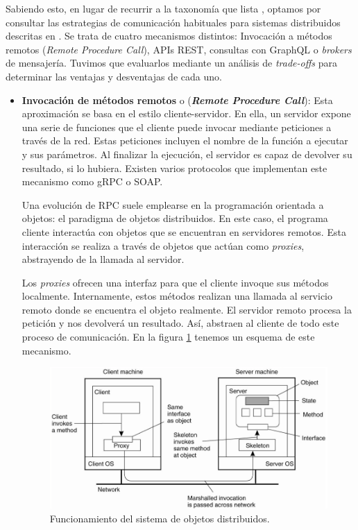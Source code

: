 Sabiendo esto, en lugar de recurrir a la taxonomía que lista \cite{mehtaTaxonomySoftwareConnectors2000}, optamos por consultar las estrategias de comunicación habituales para sistemas distribuidos descritas en \cite{newmanBuildingMicroservicesDesigning2021}. Se trata de cuatro mecanismos distintos: Invocación a métodos remotos (\emph{Remote Procedure Call}), APIs REST, consultas con GraphQL o \emph{brokers} de mensajería. Tuvimos que evaluarlos mediante un análisis de \emph{trade-offs} para determinar las ventajas y desventajas de cada uno.

\begin{itemize}
  \item \textbf{Invocación de métodos remotos} o (\emph{\textbf{Remote Procedure Call}}): Esta aproximación se basa en el estilo cliente-servidor. En ella, un servidor expone una serie de funciones que el cliente puede invocar mediante peticiones a través de la red. Estas peticiones incluyen el nombre de la función a ejecutar y sus parámetros. Al finalizar la ejecución, el servidor es capaz de devolver su resultado, si lo hubiera. Existen varios protocolos que implementan este mecanismo como gRPC o SOAP.

  Una evolución de RPC suele emplearse en la programación orientada a objetos: el paradigma de objetos distribuidos. \cite{tanenbaumChapter10Distributed2007} En este caso, el programa cliente interactúa con objetos que se encuentran en servidores remotos. Esta interacción se realiza a través de objetos que actúan como \emph{proxies}, abstrayendo de la llamada al servidor.

  Los \emph{proxies} ofrecen una interfaz para que el cliente invoque sus métodos localmente. Internamente, estos métodos realizan una llamada al servicio remoto donde se encuentra el objeto realmente. El servidor remoto procesa la petición y nos devolverá un resultado. Así, abstraen al cliente de todo este proceso de comunicación. En la figura \ref{fig:rpc-distributedobjects} tenemos un esquema de este mecanismo.

  \begin{figure}[htb]
    \centering
    \includegraphics[scale=1.5]{03_arquitectura/images/rpc-distributedobjects}
    \caption[Funcionamiento del sistema de objetos distribuidos]{Funcionamiento del sistema de objetos distribuidos. \cite{tanenbaumChapter10Distributed2007}}
    \label{fig:rpc-distributedobjects}
  \end{figure}


\end{itemize}
